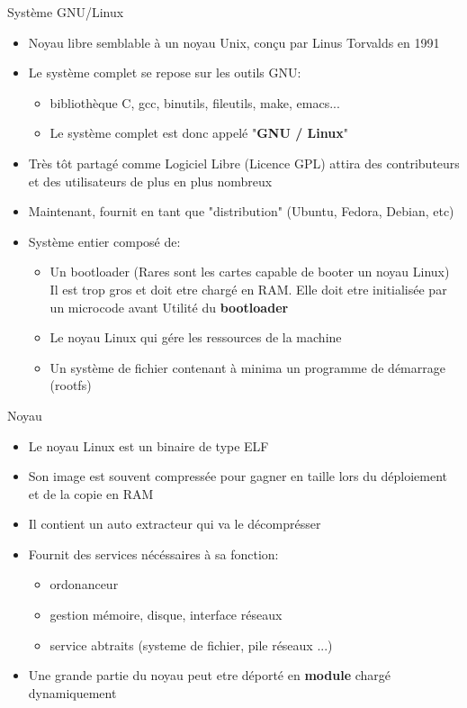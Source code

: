\begin{frame}{Système GNU/Linux}{}
  \begin{itemize}
  \item Noyau libre semblable à un noyau Unix, conçu par Linus Torvalds en 1991
  \item Le système complet se repose sur les outils GNU:
    \begin{itemize}
    \item bibliothèque C, gcc, binutils, fileutils, make, emacs...
    \item Le système complet est donc appelé "\textbf{GNU / Linux}"
    \end{itemize}
  \item Très tôt partagé comme Logiciel Libre (Licence GPL) \MVRightarrow attira des contributeurs et des utilisateurs de plus en plus nombreux
  \item Maintenant, fournit en tant que "distribution" (Ubuntu, Fedora, Debian, etc)
  \item Système entier composé de:
    \begin{itemize}
    \item Un bootloader (Rares sont les cartes capable de booter un noyau Linux)\\
      Il est trop gros et doit etre chargé en RAM. Elle doit etre initialisée par un microcode avant \MVRightarrow{} Utilité du \textbf{bootloader}
    \item Le noyau Linux qui gére les ressources de la machine
    \item Un système de fichier contenant à minima un programme de démarrage (rootfs)
    \end{itemize}
  \end{itemize}
\end{frame}

\begin{frame}{Noyau}{}
  \begin{itemize}
  \item Le noyau Linux est un binaire de type ELF
  \item Son image est souvent compressée pour gagner en taille lors du déploiement et de la copie en RAM
  \item Il contient un auto extracteur qui va le décomprésser
  \item Fournit des services nécéssaires à sa fonction:
    \begin{itemize}
    \item ordonanceur
    \item gestion mémoire, disque, interface réseaux
    \item service abtraits (systeme de fichier, pile réseaux ...)
    \end{itemize}
  \item Une grande partie du noyau peut etre déporté en \textbf{module} chargé dynamiquement
  \end{itemize}
\end{frame}

